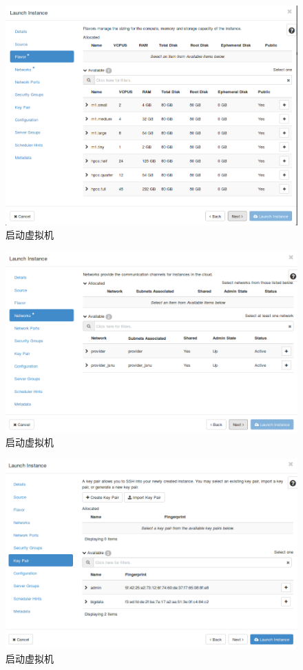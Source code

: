 \documentclass[12pt]{article}
\begin{document}
\begin{figure}[!htb]
\centering
\includegraphics[width=6in]{./figures/launchInstanceII}
\caption{启动虚拟机}
\label{fig:launchInstanceII}
\end{figure}
\begin{figure}[!htb]
\centering
\includegraphics[width=6in]{./figures/launchInstanceIII}
\caption{启动虚拟机}
\label{fig:launchInstanceIII}
\end{figure}
\begin{figure}[!htb]
\centering
\includegraphics[width=6in]{./figures/launchInstanceKey}
\caption{启动虚拟机}
\label{fig:launchInstanceKey}
\end{figure}
\end{document}
